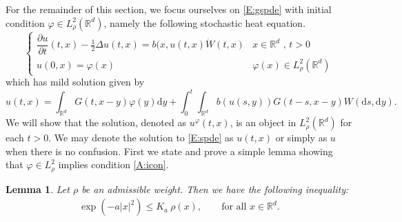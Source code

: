 \documentclass[a4paper,11pt]{article}%
\numberwithin{equation}{section}
\theoremstyle{plain}
\newtheorem{lemma}[theorem]{Lemma}
\theoremstyle{definition}
\newcommand{\R}{\mathbb{R}}
\newcommand{\ud}{\ensuremath{ \mathrm{d} }}
\begin{document}
%

For the remainder of this section, we focus ourselves on \eqref{E:gspde} with initial condition $\varphi \in L^2_\rho(\R^d)$,
namely the following stochastic heat equation.
\begin{equation}
\begin{cases}
\dfrac{\partial u}{\partial t}(t,x)-\frac{1}{2}\Delta u(t,x) = b(x,u(t,x)\dot W(t,x) & \text{$x\in \R^d$ , $t>0$}
\\ u(0,x)=\varphi(x) & \varphi(x) \in L^2_\rho(\R^d)
\end{cases}  \label{E:spde}
\end{equation}
which has mild solution given by
\begin{equation}
u(t,x)=\int_{\R^d}G(t,x-y)\varphi(y)\ud y + \int_0^t\int_{\R^d}b(u(s,y))G(t-s,x-y)W(\ud s,\ud y) \label{E:msol}.
\end{equation}
We will show that the solution, denoted as $u^\varphi(t,x)$, is an object in $L^2_\rho(\R^d)$ for each $t>0$. We may
denote the solution to \eqref{E:spde} as $u(t,x)$ or simply as $u$ when there is no confusion. First we state and prove
a simple lemma showing that $\varphi \in L^2_\rho$ implies condition \eqref{A:icon}.

\begin{lemma}\label{L:RhoDom} Let $\rho$ be an admissible weight. Then we have the following inequality:
	\begin{align}
	\label{E:RhoDom}
	\exp\left(-a|x|^2\right)\le K_a\: \rho(x),\qquad \text{for all $x\in\R^d$.}
	\end{align}
\end{lemma}
\end{document}
